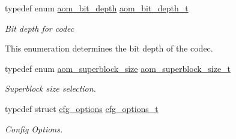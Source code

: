 \begin{DoxyCompactItemize}
typedef enum \hyperlink{group__codec_ga6ed0e98eba4651c1ad845e39498e4153}{aom\+\_\+bit\+\_\+depth} \hyperlink{group__codec_ga90c2026e798a669241dc57464472a198}{aom\+\_\+bit\+\_\+depth\+\_\+t}
\begin{DoxyCompactList}\small\item\em Bit depth for codec
\begin{DoxyItemize}
\item This enumeration determines the bit depth of the codec. 
\end{DoxyItemize}\end{DoxyCompactList}\item 
typedef enum \hyperlink{group__codec_gac34a24f7c6c0fef7518aed0da4425f61}{aom\+\_\+superblock\+\_\+size} \hyperlink{group__codec_ga8d0bf39eb86f047f1b2f6f1efe05a3ae}{aom\+\_\+superblock\+\_\+size\+\_\+t}
\begin{DoxyCompactList}\small\item\em Superblock size selection. \end{DoxyCompactList}\item 
typedef struct \hyperlink{structcfg__options}{cfg\+\_\+options} \hyperlink{group__codec_ga58cddec4492c70945a2b4c3773c665b0}{cfg\+\_\+options\+\_\+t}
\begin{DoxyCompactList}\small\item\em Config Options. \end{DoxyCompactList}\end{DoxyCompactItemize}
